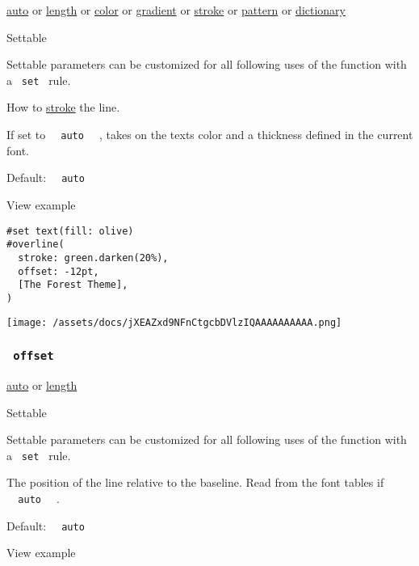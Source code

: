 \href{/docs/reference/foundations/auto/}{auto} {or}
\href{/docs/reference/layout/length/}{length} {or}
\href{/docs/reference/visualize/color/}{color} {or}
\href{/docs/reference/visualize/gradient/}{gradient} {or}
\href{/docs/reference/visualize/stroke/}{stroke} {or}
\href{/docs/reference/visualize/pattern/}{pattern} {or}
\href{/docs/reference/foundations/dictionary/}{dictionary}

{{ Settable }}

\label{parameters-stroke-settable-tooltip}
Settable parameters can be customized for all following uses of the
function with a \texttt{\ set\ } rule.

How to \href{/docs/reference/visualize/stroke/}{stroke} the line.

If set to \texttt{\ }{\texttt{\ auto\ }}\texttt{\ } , takes on the
text\textquotesingle s color and a thickness defined in the current
font.

Default: \texttt{\ }{\texttt{\ auto\ }}\texttt{\ }


View example

\begin{verbatim}
#set text(fill: olive)
#overline(
  stroke: green.darken(20%),
  offset: -12pt,
  [The Forest Theme],
)
\end{verbatim}

\texttt{[image: /assets/docs/jXEAZxd9NFnCtgcbDVlzIQAAAAAAAAAA.png]}

\subsubsection{\texorpdfstring{\texttt{\ offset\ }}{ offset }}\label{parameters-offset}

\href{/docs/reference/foundations/auto/}{auto} {or}
\href{/docs/reference/layout/length/}{length}

{{ Settable }}

\label{parameters-offset-settable-tooltip}
Settable parameters can be customized for all following uses of the
function with a \texttt{\ set\ } rule.

The position of the line relative to the baseline. Read from the font
tables if \texttt{\ }{\texttt{\ auto\ }}\texttt{\ } .

Default: \texttt{\ }{\texttt{\ auto\ }}\texttt{\ }


View example

